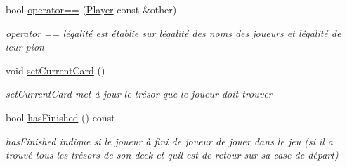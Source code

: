 \begin{DoxyCompactItemize}
bool \mbox{\hyperlink{class_player_a6a14a7da6a14d152fda0374aabdef6cb}{operator==}} (\mbox{\hyperlink{class_player}{Player}} const \&other)
\begin{DoxyCompactList}\small\item\em operator == l\textquotesingle{}égalité est établie sur l\textquotesingle{}égalité des noms des joueurs et l\textquotesingle{}égalité de leur pion \end{DoxyCompactList}\item 
\mbox{\label{class_player_af7ae24f0abe3ecaaa68eda7e8ebd11db}} 
void \mbox{\hyperlink{class_player_af7ae24f0abe3ecaaa68eda7e8ebd11db}{set\+Current\+Card}} ()
\begin{DoxyCompactList}\small\item\em set\+Current\+Card met à jour le trésor que le joueur doit trouver \end{DoxyCompactList}\item 
bool \mbox{\hyperlink{class_player_a5786ecbfaf85723d3a7f4cb126ba87bc}{has\+Finished}} () const
\begin{DoxyCompactList}\small\item\em has\+Finished indique si le joueur à fini de joueur de jouer dans le jeu (si il a trouvé tous les trésors de son deck et qu\textquotesingle{}il est de retour sur sa case de départ) \end{DoxyCompactList}\end{DoxyCompactItemize}
